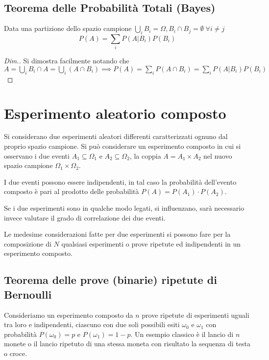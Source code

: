 \subsection{Teorema delle Probabilità Totali (Bayes)}
Data una partizione dello spazio campione $\bigcup_i B_i=\Omega, B_i\cap B_j=\emptyset \;\forall i\neq j$
\begin{equation}
	P(A)=\sum_i P(A|B_i)P(B_i)
\end{equation}

\begin{proof}[Dim.]
Si dimostra facilmente notando che $A=\bigcup_i B_i \cap A=\bigcup_i (A\cap B_i) \implies P(A)=\sum_i P(A\cap B_i)=\sum_i P(A|B_i)P(B_i)$
\end{proof}

\section{Esperimento aleatorio composto}
Si considerano due esperimenti aleatori differenti caratterizzati ognuno dal proprio spazio campione. Si può considerare un esperimento composto in cui si osservano i due eventi $A_1\subseteq\Omega_1$ e $A_2\subseteq\Omega_2$, la coppia $A=A_1\times A_2$ nel nuovo spazio campione $\Omega_1\times\Omega_2$.

I due eventi possono essere indipendenti, in tal caso la probabilità dell'evento composto è pari al prodotto delle probabilità $P(A)=P(A_1)\cdot P(A_2)$.

Se i due esperimenti sono in qualche modo legati, si influenzano, sarà necessario invece valutare il grado di correlazione dei due eventi.

Le medesime considerazioni fatte per due esperimenti si possono fare per la composizione di $N$ qualsiasi esperimenti o prove ripetute ed indipendenti in un esperimento composto.

\subsection{Teorema delle prove (binarie) ripetute di Bernoulli}
Consideriamo un esperimento composto da $n$ prove ripetute di esperimenti uguali tra loro e indipendenti, ciascuno con due soli possibili esiti $\omega_0$ e $\omega_1$ con probabilità $P(\omega_0)=p$ e $P(\omega_1)=1-p$.
Un esempio classico è il lancio di $n$ monete o il lancio ripetuto di una stessa moneta con risultato la sequenza di testa o croce.

